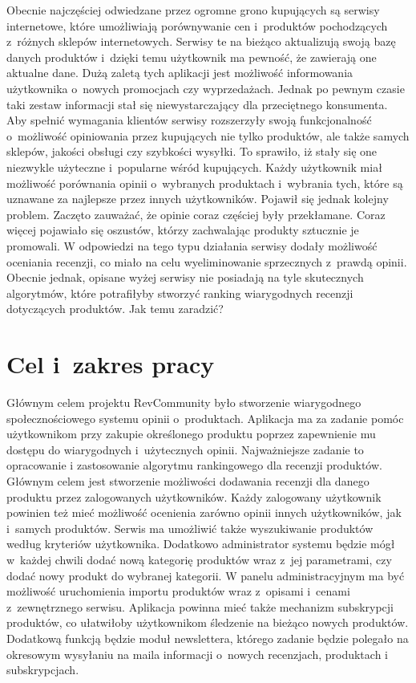 Obecnie najczęściej odwiedzane przez ogromne grono kupujących są serwisy internetowe, które umożliwiają porównywanie cen i~produktów pochodzących z~różnych sklepów internetowych. Serwisy te na bieżąco aktualizują swoją bazę danych produktów i~dzięki temu użytkownik ma pewność, że zawierają one aktualne dane. Dużą zaletą tych aplikacji jest możliwość informowania użytkownika o~nowych promocjach czy wyprzedażach. Jednak po pewnym czasie taki zestaw informacji stał się niewystarczający dla przeciętnego konsumenta. Aby spełnić wymagania klientów serwisy rozszerzyły swoją funkcjonalność o~możliwość opiniowania przez kupujących nie tylko produktów, ale także samych sklepów, jakości obsługi czy szybkości wysyłki. To sprawiło, iż stały się one niezwykle użyteczne i~popularne wśród kupujących. Każdy użytkownik miał możliwość porównania opinii o~wybranych produktach i~wybrania tych, które są uznawane za najlepsze przez innych użytkowników. Pojawił się jednak kolejny problem. Zaczęto zauważać, że opinie coraz częściej były przekłamane. Coraz więcej pojawiało się oszustów, którzy zachwalając produkty sztucznie je promowali. W odpowiedzi na tego typu działania serwisy dodały możliwość oceniania recenzji, co miało na celu wyeliminowanie sprzecznych z~prawdą opinii. Obecnie jednak, opisane wyżej serwisy nie posiadają na tyle skutecznych algorytmów, które potrafiłyby stworzyć ranking wiarygodnych recenzji dotyczących produktów. Jak temu zaradzić?  
 


\section{Cel i~zakres pracy}
Głównym celem projektu RevCommunity było stworzenie wiarygodnego społecznościowego systemu  opinii o~produktach. Aplikacja ma za zadanie pomóc użytkownikom przy zakupie określonego produktu poprzez zapewnienie mu dostępu do wiarygodnych i~użytecznych opinii. Najważniejsze zadanie to opracowanie i zastosowanie algorytmu rankingowego dla recenzji produktów. Głównym celem jest stworzenie możliwości dodawania recenzji dla danego produktu przez zalogowanych użytkowników. Każdy zalogowany użytkownik powinien też mieć możliwość ocenienia zarówno opinii innych użytkowników, jak i~samych produktów. Serwis ma umożliwić także wyszukiwanie produktów według kryteriów użytkownika. Dodatkowo administrator systemu będzie mógł w~każdej chwili dodać nową kategorię produktów wraz z~jej parametrami, czy dodać nowy produkt do wybranej kategorii. W panelu administracyjnym ma być możliwość uruchomienia importu produktów wraz z~opisami i~cenami z~zewnętrznego serwisu. Aplikacja powinna mieć także mechanizm subskrypcji produktów, co ułatwiłoby użytkownikom śledzenie na bieżąco nowych produktów. Dodatkową funkcją będzie moduł newslettera, którego zadanie będzie polegało na okresowym wysyłaniu na maila informacji o~nowych recenzjach, produktach i subskrypcjach. 

